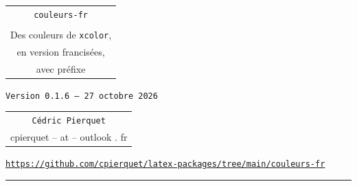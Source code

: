 \documentclass[french,11pt,a4paper]{article}
\def\TPversion{0.1.6}
\def\TPdate{27 octobre 2026}
\begin{document}
\pagestyle{fancy}

\thispagestyle{empty}

\begin{center}
	\begin{minipage}{0.75\linewidth}
	\begin{tcolorbox}[colframe=yellow,colback=yellow!15]
		\begin{center}
			\begin{tabular}{c}
				{\Huge \texttt{couleurs-fr}}\\
				\\
				{\LARGE Des couleurs de \texttt{xcolor},} \\
				{\LARGE en version francisées,} \\
				{\LARGE avec préfixe}
			\end{tabular}

			\medskip

			{\small \texttt{Version \TPversion{} -- \TPdate}}
		\end{center}
	\end{tcolorbox}
\end{minipage}
\end{center}

\begin{center}
	\begin{tabular}{c}
		\texttt{Cédric Pierquet}\\
		{\ttfamily cpierquet -- at -- outlook . fr}
	\end{tabular}
\end{center}

\begin{center}
	\begin{minipage}{0.85\linewidth}
		\begin{tcolorbox}[colframe=teal,colback=teal!10,halign=center,fontupper=\footnotesize]
			\texttt{\url{https://github.com/cpierquet/latex-packages/tree/main/couleurs-fr}}
		\end{tcolorbox}
	\end{minipage}
\end{center}

\hrule

\vspace*{5mm}

\end{document}
